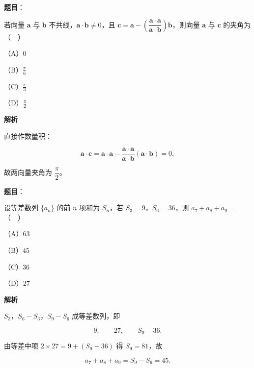 \begin{answer}

\textbf{题目}：

若向量 $\boldsymbol a$ 与 $\boldsymbol b$ 不共线，$\boldsymbol a\cdot\boldsymbol b\neq0$，且 $\boldsymbol c=\boldsymbol a-\left(\dfrac{\boldsymbol a\cdot\boldsymbol a}{\boldsymbol a\cdot\boldsymbol b}\right)\boldsymbol b$，则向量 $\boldsymbol a$ 与 $\boldsymbol c$ 的夹角为（　）

（A）$0$

（B）$\frac{\pi}{6}$

（C）$\frac{\pi}{3}$

（D）$\frac{\pi}{2}$

\textbf{解析}

直接作数量积：

\nopagebreak[4]
\[\boldsymbol a\cdot\boldsymbol c=\boldsymbol a\cdot\boldsymbol a-\frac{\boldsymbol a\cdot\boldsymbol a}{\boldsymbol a\cdot\boldsymbol b}(\boldsymbol a\cdot\boldsymbol b)=0,\]

故两向量夹角为 $\dfrac{\pi}{2}$。


\end{answer}
\begin{answer}

\textbf{题目}：

设等差数列 $\{a_n\}$ 的前 $n$ 项和为 $S_n$，若 $S_3=9$，$S_6=36$，则 $a_7+a_8+a_9=$（　）

（A）$63$

（B）$45$

（C）$36$

（D）$27$

\textbf{解析}

$S_3$，$S_6-S_3$，$S_9-S_6$ 成等差数列，即

\nopagebreak[4]
\[9,\qquad 27,\qquad S_9-36.\]

由等差中项 $2\times27=9+(S_9-36)$ 得 $S_9=81$，故

\nopagebreak[4]
\[a_7+a_8+a_9=S_9-S_6=45.\]


\end{answer}
